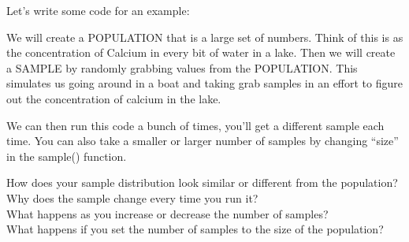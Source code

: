 \documentclass[
]{book}
\newenvironment{Shaded}{\begin{snugshade}}{\end{snugshade}}
\newcommand{\AttributeTok}[1]{\textcolor[rgb]{0.77,0.63,0.00}{#1}}
\newcommand{\ConstantTok}[1]{\textcolor[rgb]{0.00,0.00,0.00}{#1}}
\newcommand{\DecValTok}[1]{\textcolor[rgb]{0.00,0.00,0.81}{#1}}
\newcommand{\FunctionTok}[1]{\textcolor[rgb]{0.00,0.00,0.00}{#1}}
\newcommand{\NormalTok}[1]{#1}
\newcommand{\OtherTok}[1]{\textcolor[rgb]{0.56,0.35,0.01}{#1}}
\newcommand{\SpecialCharTok}[1]{\textcolor[rgb]{0.00,0.00,0.00}{#1}}
\newcommand{\StringTok}[1]{\textcolor[rgb]{0.31,0.60,0.02}{#1}}
\begin{document}
Let's write some code for an example:

We will create a POPULATION that is a large set of numbers. Think of this is as the concentration of Calcium in every bit of water in a lake. Then we will create a SAMPLE by randomly grabbing values from the POPULATION. This simulates us going around in a boat and taking grab samples in an effort to figure out the concentration of calcium in the lake.

We can then run this code a bunch of times, you'll get a different sample each time. You can also take a smaller or larger number of samples by changing ``size'' in the sample() function.

How does your sample distribution look similar or different from the population?\\
Why does the sample change every time you run it?\\
What happens as you increase or decrease the number of samples?\\
What happens if you set the number of samples to the size of the population?

\begin{Shaded}
\end{Shaded}
\end{document}
